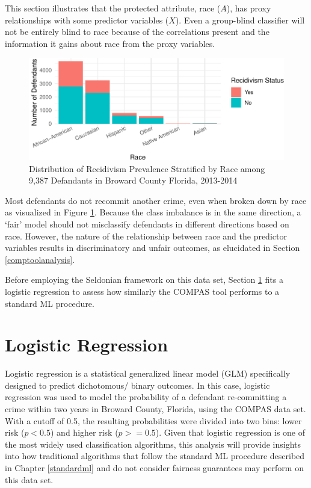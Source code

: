 \documentclass[12pt, twoside]{amherstthesis}
\begin{document}
This section illustrates that the protected attribute, race (\(A\)), has proxy relationships with some predictor variables (\(X\)). Even a group-blind classifier will not be entirely blind to race because of the correlations present and the information it gains about race from the proxy variables.
\begin{figure}

{\centering \includegraphics{Dasha-Asienga_StatThesis_files/figure-latex/ch3fig13-1} 

}

\caption{Distribution of Recidivism Prevalence Stratified by Race among 9,387 Defandants in Broward County Florida, 2013-2014}\label{fig:ch3fig13}
\end{figure}
Most defendants do not recommit another crime, even when broken down by race as visualized in Figure \ref{fig:ch3fig13}. Because the class imbalance is in the same direction, a `fair' model should not misclassify defendants in different directions based on race. However, the nature of the relationship between race and the predictor variables results in discriminatory and unfair outcomes, as elucidated in Section \ref{comptoolanalysis}.

Before employing the Seldonian framework on this data set, Section \ref{logreg} fits a logistic regression to assess how similarly the COMPAS tool performs to a standard ML procedure.

\hypertarget{logreg}{%
\section{Logistic Regression}\label{logreg}}

Logistic regression is a statistical generalized linear model (GLM) specifically designed to predict dichotomous/ binary outcomes. In this case, logistic regression was used to model the probability of a defendant re-committing a crime within two years in Broward County, Florida, using the COMPAS data set. With a cutoff of 0.5, the resulting probabilities were divided into two bins: lower risk (\(p < 0.5\)) and higher risk (\(p >= 0.5\)). Given that logistic regression is one of the most widely used classification algorithms, this analysis will provide insights into how traditional algorithms that follow the standard ML procedure described in Chapter \ref{standardml} and do not consider fairness guarantees may perform on this data set.
\end{document}
